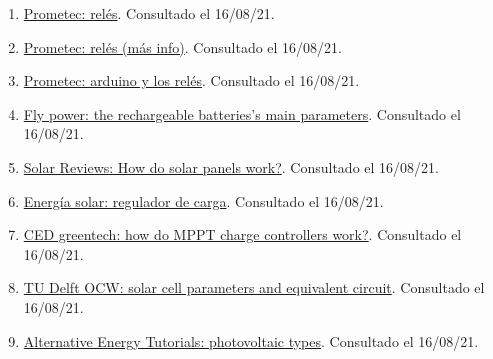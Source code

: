 \documentclass[12pt]{article}
\begin{document}
\begin{enumerate}
			\item 
			\label{bib: prometec relés}
			\href{https://www.prometec.net/reles-s4a/}{Prometec: relés}. Consultado el 16/08/21.
			
			\item 
			\label{bib: prometec relés (más info)}
			\href{https://www.prometec.net/mas-sobre-reles/}{Prometec: relés (más info)}. Consultado el 16/08/21.
			
			\item 
			\label{bib: prometec relés y arduino}
			\href{https://www.prometec.net/reles/}{Prometec: arduino y los relés}. Consultado el 16/08/21.
			
			\item 
			\label{bib: fly power rechargeable battery param}
			\href{https://fly-power.com/en/battery-knowledge/item/2-rechargeable-batteries-s-main-parameters}{Fly power: the rechargeable batteries's main parameters}. Consultado el 16/08/21.
			
			\item 
			\label{bib: solar reviews how solar panels work}
			\href{https://www.solarreviews.com/blog/how-do-solar-panels-work}{Solar Reviews: How do solar panels work?}. Consultado el 16/08/21.
			
			\item 
			\label{bib: energia solar regulador de carga}
			\href{https://solar-energia.net/energia-solar-fotovoltaica/elementos/instalaciones-autonomas/reguladores-carga}{Energía solar: regulador de carga}. Consultado el 16/08/21.
			
			\item 
			\label{bib: CED greentech how mppt works}
			\href{https://www.cedgreentech.com/article/how-do-mppt-charge-controllers-work}{CED greentech: how do MPPT charge controllers work?}. Consultado el 16/08/21.
			
			\item 
			\label{bib: TU delft OCW solar cell param}
			\href{https://ocw.tudelft.nl/wp-content/uploads/solar_energy_section_9_1_9_3.pdf}{TU Delft OCW: solar cell parameters and equivalent circuit}. Consultado el 16/08/21.
			
			\item 
			\label{bib: alternative energy photovoltaic types}
			\href{https://www.alternative-energy-tutorials.com/photovoltaics/photovoltaic-types.html}{Alternative Energy Tutorials: photovoltaic types}. Consultado el 16/08/21.
			

\end{enumerate}
\end{document}
